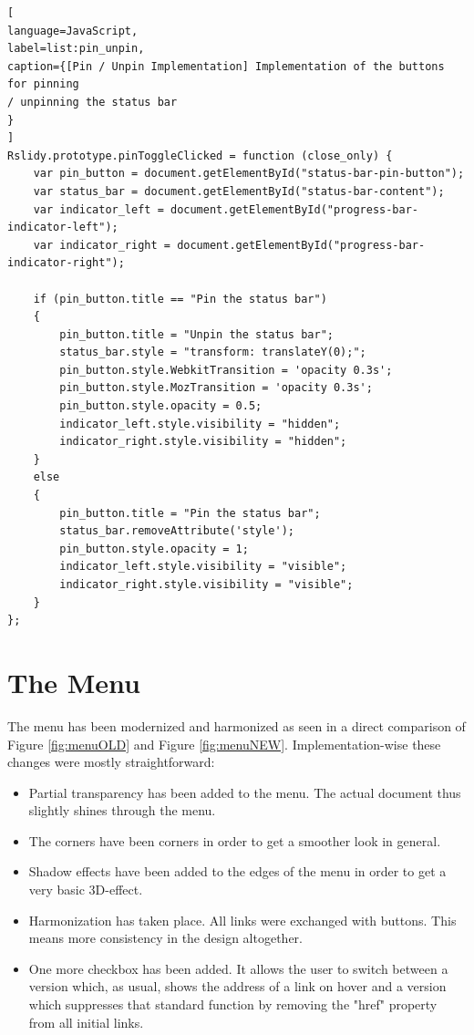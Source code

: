 \begin{minipage}{\linewidth}
\begin{lstlisting}[
language=JavaScript,
label=list:pin_unpin,
caption={[Pin / Unpin Implementation] Implementation of the buttons for pinning 
/ unpinning the status bar 
}
]
Rslidy.prototype.pinToggleClicked = function (close_only) {
	var pin_button = document.getElementById("status-bar-pin-button");
	var status_bar = document.getElementById("status-bar-content");
	var indicator_left = document.getElementById("progress-bar-indicator-left");
	var indicator_right = document.getElementById("progress-bar-indicator-right");

	if (pin_button.title == "Pin the status bar")
	{
		pin_button.title = "Unpin the status bar";
		status_bar.style = "transform: translateY(0);";
		pin_button.style.WebkitTransition = 'opacity 0.3s';
		pin_button.style.MozTransition = 'opacity 0.3s';
		pin_button.style.opacity = 0.5;
		indicator_left.style.visibility = "hidden";
		indicator_right.style.visibility = "hidden";
	}
	else
	{			
		pin_button.title = "Pin the status bar";
		status_bar.removeAttribute('style');
		pin_button.style.opacity = 1;
		indicator_left.style.visibility = "visible";
		indicator_right.style.visibility = "visible";
	}
};
\end{lstlisting}
\end{minipage}

\section{The Menu}
The menu has been modernized and harmonized as seen in a direct comparison of 
Figure \ref{fig:menuOLD} and Figure \ref{fig:menuNEW}. Implementation-wise 
these changes were mostly straightforward:
\begin{itemize}
	\item Partial transparency has been added to the menu. The actual 
document thus slightly shines through the menu.
	\item The corners have been corners in order to get a smoother look in 
general.
	\item Shadow effects have been added to the edges of the menu in order 
to get a very basic 3D-effect.
	\item Harmonization has taken place. All links were exchanged with 
buttons. This means more consistency in the design altogether. 
	\item One more checkbox has been added. It allows the user to switch 
between a version which, as usual, shows the address of a link on hover and a 
version which suppresses that standard function by removing the "href" property 
from all initial links.
\end{itemize}

